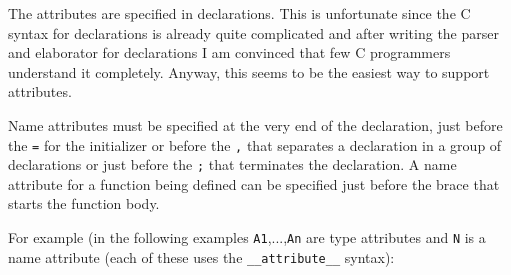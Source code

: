 \documentclass{article}
\def\t#1{{\tt #1}}
\begin{document}
 The attributes are specified in declarations. This is unfortunate since the C
syntax for declarations is already quite complicated and after writing the
parser and elaborator for declarations I am convinced that few C programmers
understand it completely. Anyway, this seems to be the easiest way to support
attributes. 

 Name attributes must be specified at the very end of the declaration, just
before the \t{=} for the initializer or before the \t{,} that separates a
declaration in a group of declarations or just before the \t{;} that
terminates the declaration. A name attribute for a function being defined can
be specified just before the brace that starts the function body.

 For example (in the following examples \t{A1},...,\t{An} are type attributes
and \t{N} is a name attribute (each of these uses the \t{\_\_attribute\_\_} syntax):

\end{document}
